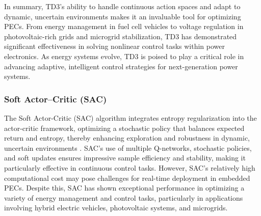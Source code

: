 
In summary, TD3's ability to handle continuous action spaces and adapt to dynamic, uncertain environments makes it an invaluable tool for optimizing PECs. From energy management in fuel cell vehicles to voltage regulation in photovoltaic-rich grids and microgrid stabilization, TD3 has demonstrated significant effectiveness in solving nonlinear control tasks within power electronics. As energy systems evolve, TD3 is poised to play a critical role in advancing adaptive, intelligent control strategies for next-generation power systems.

\subsubsection{Soft Actor–Critic (SAC)}

The Soft Actor-Critic (SAC) algorithm integrates entropy regularization into the actor-critic framework, optimizing a stochastic policy that balances expected return and entropy, thereby enhancing exploration and robustness in dynamic, uncertain environments \cite{haarnoja2018soft}. SAC's use of multiple Q-networks, stochastic policies, and soft updates ensures impressive sample efficiency and stability, making it particularly effective in continuous control tasks. However, SAC's relatively high computational cost may pose challenges for real-time deployment in embedded PECs. Despite this, SAC has shown exceptional performance in optimizing a variety of energy management and control tasks, particularly in applications involving hybrid electric vehicles, photovoltaic systems, and microgrids.


